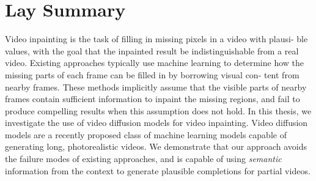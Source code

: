 

\chapter{Lay Summary}

Video inpainting is the task of filling in missing pixels in a video with plausi-
ble values, with the goal that the inpainted result be indistinguishable from a
real video. Existing approaches typically use machine learning to determine
how the missing parts of each frame can be filled in by borrowing visual con-
tent from nearby frames. These methods implicitly assume that the visible
parts of nearby frames contain sufficient information to inpaint the
missing regions, and fail to produce compelling results when this assumption
does not hold. In this thesis, we investigate the use of video diffusion models
for video inpainting. Video diffusion models are a recently proposed class
of machine learning models capable of generating long, photorealistic videos. We demonstrate that our approach avoids the failure
modes of existing approaches, and is capable of using \emph{semantic} information
from the context to generate plausible completions for partial videos.

